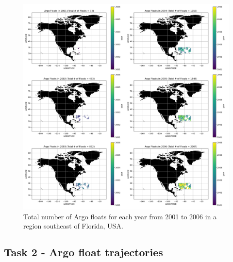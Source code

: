 \documentclass{article}
\begin{document}
\begin{figure}[H]
\includegraphics[width=\textwidth,height=\textheight,keepaspectratio]{total_argo.png}
\caption{Total number of Argo floats for each year from 2001 to 2006 in a region southeast of Florida, USA.}
\label{fig:task 1}
 
\end{figure}


\subsection{Task 2 - Argo float trajectories}
\end{document}
